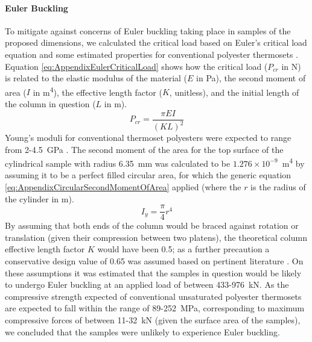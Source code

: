 \paragraph{Euler Buckling}
To mitigate against concerns of Euler buckling taking place in samples of
 the proposed dimensions, we calculated the critical load based on
 Euler's critical load equation and some estimated properties for
 conventional polyester thermosets \autocite{Euler1744}.
Equation \ref{eq:AppendixEulerCriticalLoad} shows how the critical load 
 (\(P_{cr}\) in \unit{\newton}) is related to the elastic modulus of the
 material (\(E\) in \unit{\pascal}), the second moment of area (\(I\) in
 \unit{\metre^{4}}),
 the effective length factor (\(K\), unitless), and the initial length of
 the column in question (\(L\) in \unit{\metre}).
\begin{equation}\label{eq:AppendixEulerCriticalLoad}
    P_{cr}=\frac{\pi EI}{(KL)^2}
\end{equation}
Young's moduli for conventional thermoset polyesters were expected to range
 from 2-4.5~\unit{\giga\pascal} \autocite{Lawrence1960}.
The second moment of the area for the top surface of the cylindrical sample
 with radius 6.35~\unit{\milli\metre} was calculated to be
 \(1.276\times10^{-9}\)~\unit{\metre^{4}} by assuming it to be a perfect
 filled circular area, for which the generic equation
 \ref{eq:AppendixCircularSecondMomentOfArea} applied (where the \(r\) is the
 radius of the cylinder in \unit{\metre}).
\begin{equation}\label{eq:AppendixCircularSecondMomentOfArea}
    I_{y}=\frac{\pi}{4}r^{4}
\end{equation}
By assuming that both ends of the column would be braced against rotation
 or translation (given their compression between two platens), the
 theoretical column effective length factor \(K\) would have been 0.5; as a
 further precaution a conservative design value of 0.65 was assumed
 based on pertinent literature \autocite{AISC1989}.
On these assumptions it was estimated that the samples in question would
 be likely to undergo Euler buckling at an applied load of between 
 433-976~\unit{\kilo\newton}.
As the compressive strength expected of conventional unsaturated
 polyester thermosets are expected to fall within the range of
 89-252~\unit{\mega\pascal}, corresponding to maximum compressive
 forces of between 11-32~\unit{\kilo\newton} (given the surface area of
 the samples), we concluded that the samples were unlikely to
 experience Euler buckling.

